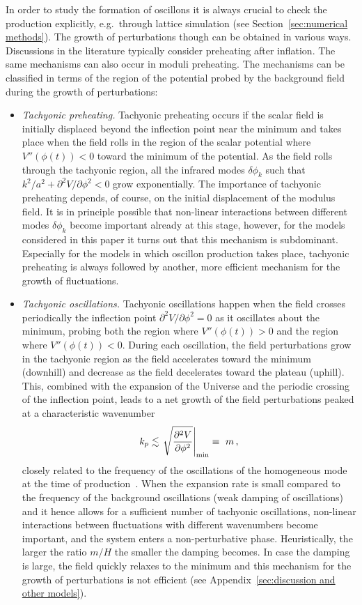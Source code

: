 \documentclass[12pt]{article}
\begin{document}
In order to study the formation of oscillons it is always crucial to check the production explicitly, e.g.~through lattice simulation (see Section~\ref{sec:numerical methods}). The growth of perturbations though can be obtained in various ways. 
Discussions in the literature typically consider preheating after inflation. The same mechanisms can also occur in moduli preheating. 
The mechanisms can be classified in terms of the region of the potential probed by the background field during the growth of perturbations:
\begin{itemize}
\item \textit{Tachyonic preheating.} Tachyonic preheating occurs if the scalar field is initially displaced beyond the inflection point near the minimum and takes place when the field rolls in the region of the scalar potential where $V''(\phi(t)) < 0$ toward the minimum of the potential.  
As the field rolls through the tachyonic region, all the infrared modes $\delta \phi_k$ such that $k^2/a^2 + \partial^2 V/\partial\phi^2<0$ grow exponentially.  
The importance of tachyonic preheating depends, of course, on the initial displacement of the modulus field. It is in principle possible that non-linear interactions between different modes $\delta \phi_k$ become important already at this stage, however, for the models considered in this paper it turns out that this mechanism is subdominant. Especially for the models in which oscillon production takes place, tachyonic preheating is always followed by another, more efficient mechanism for the growth of fluctuations.
\item \textit{Tachyonic oscillations.} Tachyonic oscillations happen when the field crosses periodically the inflection point $\partial^2V/\partial\phi^2=0$ as it oscillates about the minimum, probing both the region where $V''(\phi(t)) > 0$ and the region where $V''(\phi(t)) < 0$. During each oscillation, the field perturbations grow in the tachyonic region as the field accelerates toward the minimum (downhill) and decrease as the field decelerates toward the plateau (uphill). This, combined with the expansion of the Universe and the periodic crossing of the inflection point, leads to a net growth of the field perturbations peaked at a characteristic wavenumber
\begin{equation}
\label{eq:Kpeak}
k_p \lesssim \left.\sqrt{\frac{\partial^2 V}{\partial \phi^2}}\right|_{\rm min} \equiv ~ m \,,
\end{equation}
closely related to the frequency of the oscillations of the homogeneous mode at the time of production~\cite{Brax:2010ai,Antusch:2015nla}. When the expansion rate is small compared to the frequency of the background oscillations (weak damping of oscillations) and it hence allows for a sufficient number of tachyonic oscillations, non-linear interactions between fluctuations with different wavenumbers become important, and the system enters a non-perturbative phase. Heuristically, the larger the ratio $m/H$ the smaller the damping becomes. In case the damping is large, the field quickly relaxes to the minimum and this mechanism for the growth of perturbations is not efficient (see Appendix~\ref{sec:discussion and other models}).


\end{itemize}
\end{document}
